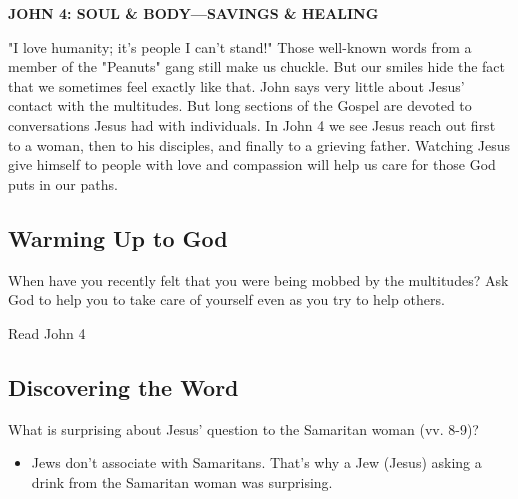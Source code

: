 \documentclass[11pt]{article}
\begin{document}
\textbf{\textbf{JOHN 4: SOUL \& BODY—SAVINGS \& HEALING}}

"I love humanity; it's people I can’t stand!" Those well-known words
from a member of the "Peanuts" gang still make us chuckle. But our
smiles hide the fact that we sometimes feel exactly like that. John
says very little about Jesus’ contact with the multitudes. But long
sections of the Gospel are devoted to conversations Jesus had with
individuals. In John 4 we see Jesus reach out first to a woman, then
to his disciples, and finally to a grieving father. Watching Jesus
give himself to people with love and compassion will help us care for
those God puts in our paths.

\subsection{Warming Up to God}
\label{sec:orgbe416fe}

When have you recently felt that you were being mobbed by the
multitudes? Ask God to help you to take care of yourself even as you
try to help others.

Read John 4

\subsection{Discovering the Word}
\label{sec:orgdfa0a7d}

What is surprising about Jesus’ question to the Samaritan woman
(vv. 8-9)?
\begin{itemize}
\item Jews don't associate with Samaritans. That's why a Jew (Jesus)
asking a drink from the Samaritan woman was surprising.
\end{itemize}
\end{document}
